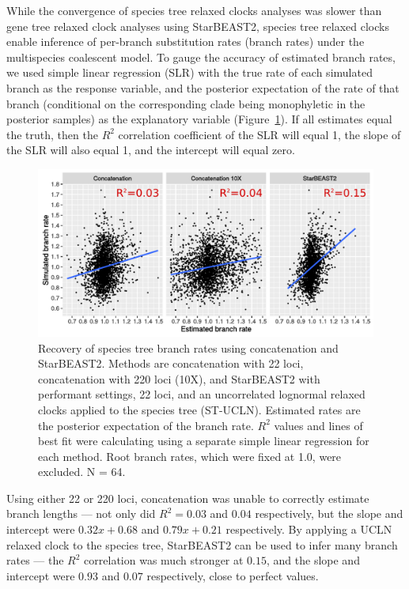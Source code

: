 \documentclass[12pt]{article}
\begin{document}
While the convergence of species tree relaxed clocks analyses was slower than
gene tree relaxed clock analyses using StarBEAST2, species tree relaxed clocks
enable inference of per-branch substitution rates (branch rates) under the multispecies
coalescent model. To gauge the accuracy of estimated branch rates, we used
simple linear regression (SLR) with the true rate of each simulated branch as
the response variable, and the posterior expectation of the rate of that branch
(conditional on the corresponding clade being monophyletic in the posterior
samples) as the explanatory variable (Figure~\ref{fig:branchRatesLM}). If all
estimates equal the truth, then the $R^2$ correlation coefficient of the SLR
will equal 1, the slope of the SLR will also equal 1, and the intercept will
equal zero.

\begin{figure}[htb!]
\centering
\includegraphics[width=16cm]{branch_rates.pdf}
\caption
{Recovery of species tree branch rates using concatenation and StarBEAST2.
Methods are concatenation with 22 loci, concatenation with 220 loci (10X), and
StarBEAST2 with performant settings, 22 loci, and an uncorrelated lognormal
relaxed clocks applied to the species tree (ST-UCLN). Estimated rates are the
posterior expectation of the branch rate. $R^2$ values and lines of best fit were calculating using a separate
simple linear regression for each method. Root branch rates, which were fixed at
1.0, were excluded. N = 64.}
\label{fig:branchRatesLM}
\end{figure}

Using either 22 or 220 loci, concatenation was unable to correctly estimate
branch lengths --- not only did $R^2 = 0.03$ and $0.04$ respectively, but the
slope and intercept were $0.32x + 0.68$ and $0.79x + 0.21$ respectively. By
applying a UCLN relaxed clock to the species tree, StarBEAST2 can be used to
infer many branch rates --- the $R^2$ correlation was much stronger at $0.15$,
and the slope and intercept were $0.93$ and $0.07$ respectively, close to
perfect values. %
\end{document}
